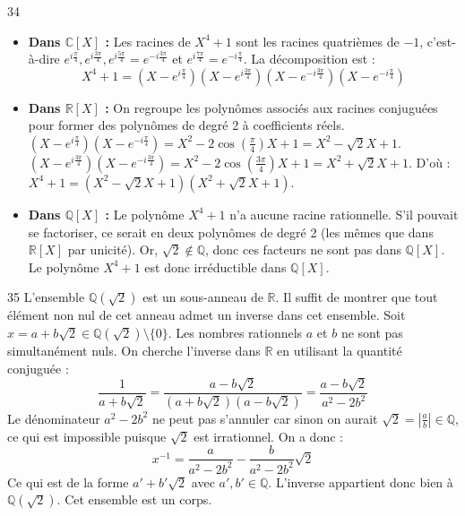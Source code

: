 \begin{correction}{34}
\begin{itemize}
 \item \textbf{Dans $\mathbb{C}[X]$ :} Les racines de $X^4+1$ sont les racines quatrièmes de $-1$, c'est-à-dire $e^{i\frac{\pi}{4}}, e^{i\frac{3\pi}{4}}, e^{i\frac{5\pi}{4}} = e^{-i\frac{3\pi}{4}}$ et $e^{i\frac{7\pi}{4}} = e^{-i\frac{\pi}{4}}$. 
 La décomposition est :
 $$ X^4+1 = (X - e^{i\frac{\pi}{4}})(X - e^{i\frac{3\pi}{4}})(X - e^{-i\frac{3\pi}{4}})(X - e^{-i\frac{\pi}{4}}) $$ 
 \item \textbf{Dans $\mathbb{R}[X]$ :} On regroupe les polynômes associés aux racines conjuguées pour former des polynômes de degré 2 à coefficients réels. 
 $(X-e^{i\frac{\pi}{4}})(X-e^{-i\frac{\pi}{4}}) = X^2 - 2\cos(\frac{\pi}{4})X + 1 = X^2 - \sqrt{2}X + 1$. 
 $(X-e^{i\frac{3\pi}{4}})(X-e^{-i\frac{3\pi}{4}}) = X^2 - 2\cos(\frac{3\pi}{4})X + 1 = X^2 + \sqrt{2}X + 1$. 
 D'où : $X^4+1 = (X^2-\sqrt{2}X+1)(X^2+\sqrt{2}X+1)$. 
 \item \textbf{Dans $\mathbb{Q}[X]$ :} Le polynôme $X^4+1$ n'a aucune racine rationnelle. S'il pouvait se factoriser, ce serait en deux polynômes de degré 2 (les mêmes que dans $\mathbb{R}[X]$ par unicité). 
 Or, $\sqrt{2} \notin \mathbb{Q}$, donc ces facteurs ne sont pas dans $\mathbb{Q}[X]$. 
 Le polynôme $X^4+1$ est donc irréductible dans $\mathbb{Q}[X]$. 
\end{itemize}
\end{correction}

\begin{correction}{35}
L'ensemble $\mathbb{Q}(\sqrt{2})$ est un sous-anneau de $\mathbb{R}$. Il suffit de montrer que tout élément non nul de cet anneau admet un inverse dans cet ensemble.
Soit $x = a+b\sqrt{2} \in \mathbb{Q}(\sqrt{2}) \setminus \{0\}$. Les nombres rationnels $a$ et $b$ ne sont pas simultanément nuls.
On cherche l'inverse dans $\mathbb{R}$ en utilisant la quantité conjuguée :
$$ \frac{1}{a+b\sqrt{2}} = \frac{a-b\sqrt{2}}{(a+b\sqrt{2})(a-b\sqrt{2})} = \frac{a-b\sqrt{2}}{a^2-2b^2} $$
Le dénominateur $a^2-2b^2$ ne peut pas s'annuler car sinon on aurait $\sqrt{2} = \left| \frac{a}{b} \right| \in \mathbb{Q}$, ce qui est impossible puisque $\sqrt{2}$ est irrationnel.
On a donc :
$$ x^{-1} = \frac{a}{a^2-2b^2} - \frac{b}{a^2-2b^2}\sqrt{2} $$
Ce qui est de la forme $a' + b'\sqrt{2}$ avec $a',b' \in \mathbb{Q}$. L'inverse appartient donc bien à $\mathbb{Q}(\sqrt{2})$. Cet ensemble est un corps.
\end{correction}

